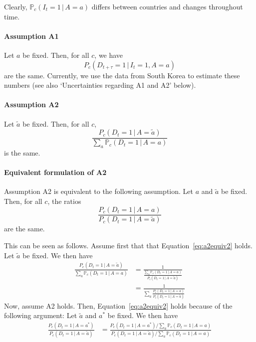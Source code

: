\documentclass[a4paper]{article}
\renewcommand\P{\mathbb{P}}
\newcommand{\given}{\, \vert \,}
\begin{document}
Clearly, $\P_c(I_{t} = 1 \given A = a)$
differs between countries and changes throughout time.

\paragraph{Assumption A1} Let $a$ be fixed. Then, for all $c$, we have
\begin{equation}
P_c(D_{t+\tau} = 1\,|\,I_t = 1, A = a)
\end{equation}
are the same. 
Currently, we use the data from South Korea to 
estimate these numbers (see also `Uncertainties regarding A1 and A2' below). 



\paragraph{Assumption A2}
Let $\tilde{a}$ be fixed. Then, for all $c$,
\begin{equation} \label{eq:a2equiv}
\frac{P_c(D_t = 1\,|\,A = \tilde{a})}
{\sum_a \P_c(D_t = 1\,|\,A = a)}
\end{equation}
is the same.





\paragraph{Equivalent formulation of A2}
Assumption A2 is equivalent to the following assumption. 
Let $a$ and $\tilde{a}$ be fixed. Then, for all $c$, the ratios 
\begin{equation} \label{eq:a2equiv2}
\frac{P_c(D_t = 1\,|\,A = a)}{P_c(D_t = 1\,|\,A = \tilde{a})}
\end{equation}
are the same. 

{\color{gray} This can be seen as follows. Assume first that 
that Equation~\eqref{eq:a2equiv2} holds. Let $\tilde{a}$ be fixed. We then have 
\begin{align*}
\frac{P_c(D_t = 1\,|\,A = \tilde{a})}
{\sum_a \P_c(D_t = 1\,|\,A = a)}
&= 
\frac{1}{\frac{\sum_a \P_c(D_t = 1\,|\,A = a)}{P_c(D_t = 1\,|\,A = \tilde{a})}
}\\
&= 
\frac{1}{\sum_a \frac{P_c(D_t = 1\,|\,A = a)}{P_c(D_t = 1\,|\,A = \tilde{a})}
}
\end{align*}
Now, assume 
A2 holds. Then, Equation~\eqref{eq:a2equiv2} holds because of the following argument:  Let $\tilde{a}$ and $a^*$ be fixed. We then have
\begin{align*}
\frac{P_c(D_t = 1\,|\,A = a^*)}
{P_c(D_t = 1\,|\,A = \tilde{a})}
&= 
\frac{P_c(D_t = 1\,|\,A = a^*)/\sum_a \P_c(D_t = 1\,|\,A = a)
}
{P_c(D_t = 1\,|\,A = \tilde{a})/\sum_a \P_c(D_t = 1\,|\,A = a)
}
\end{align*}}
\end{document}
